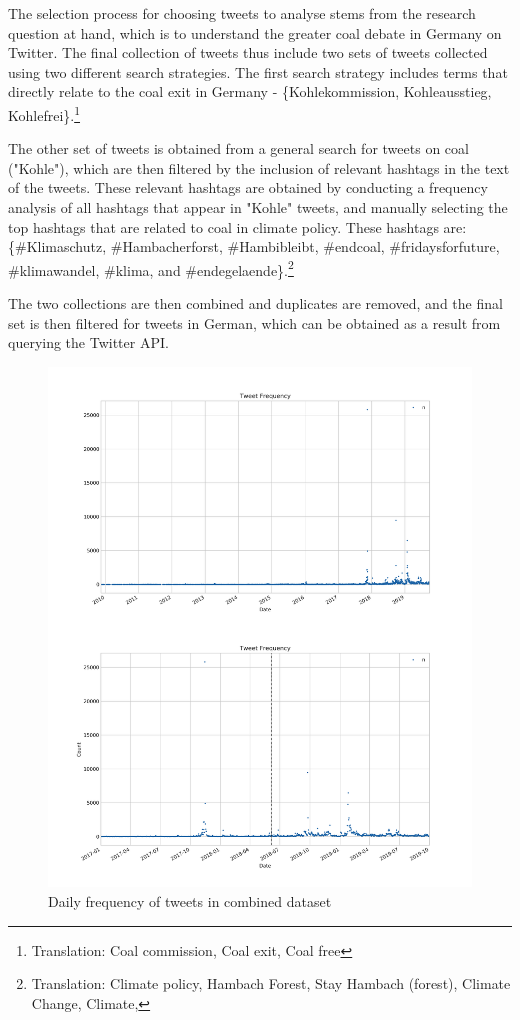 \documentclass[9pt,twocolumn,twoside,lineno]{pnas-new}
\begin{document}

The selection process for choosing tweets to analyse stems from the research question at hand, which is to understand the greater coal debate in Germany on Twitter. The final collection of tweets thus include two sets of tweets collected using two different search strategies. The first search strategy includes terms that directly relate to the coal exit in Germany - \{Kohlekommission, Kohleausstieg, Kohlefrei\}.\footnote{Translation: Coal commission, Coal exit, Coal free}

The other set of tweets is obtained from a general search for tweets on coal ("Kohle"), which are then filtered by the inclusion of relevant hashtags in the text of the tweets. These relevant hashtags are obtained by conducting a frequency analysis of all hashtags that appear in "Kohle" tweets, and manually selecting the top hashtags that are related to coal in climate policy. These hashtags are:  \{\#Klimaschutz, \#Hambacherforst, \#Hambibleibt, \#endcoal, \#fridaysforfuture, \#klimawandel, \#klima, and \#endegelaende\}.\footnote{Translation: Climate policy, Hambach Forest, Stay Hambach (forest), Climate Change, Climate,} 

The two collections are then combined and duplicates are removed, and the final set is then filtered for tweets in German, which can be obtained as a result from querying the Twitter API. 

\begin{figure} 
	\begin{center}
		\includegraphics[width=\linewidth]{figures/tweet_frequency_combine}
	\end{center}
	\caption{Daily frequency of tweets in combined dataset}
	\label{fig:tweet_frequency}
\end{figure}
\end{document}
